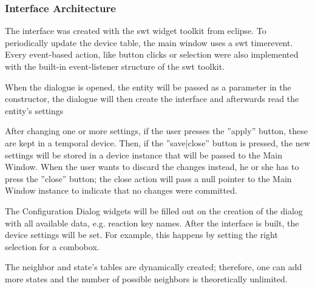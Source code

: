 \subsubsection{Interface Architecture}
The interface was created with the swt widget toolkit from eclipse. %
To periodically update the device table, the main window uses a swt timerevent. Every event-based action, like button clicks or selection were also implemented with the built-in event-listener structure of the swt toolkit. %

When the dialogue is opened, the entity will be passed as a parameter in the constructor, the dialogue will then create the interface and afterwards read the entity's settings %

After changing one or more settings, if the user presses the ''apply'' button, these are kept in a temporal device. Then, if the ''save|close'' button is pressed, the new settings will be stored in a device instance that will be passed to the Main Window. When the user wants to discard the changes instead, he or she has to press the ''close'' button; the close action will pass a null pointer to the Main Window instance to indicate that no changes were committed. 


The Configuration Dialog widgets will be filled out on the creation of the dialog with all available data, e.g. reaction key names. After the interface is built, the device settings will be set. For example, this happens by setting the right selection for a combobox.

The neighbor and state's tables are dynamically created; therefore, one can add more states and the number of possible neighbors is theoretically unlimited.



